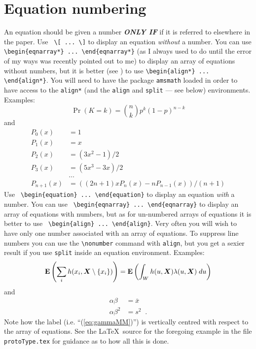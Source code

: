 \documentclass[times, doublespace]{anzsauth}
\newcommand{\E}{\mbox{$\boldsymbol{\rm E}$}}
\newcommand{\bX}{\mbox{$\boldsymbol{X}$}}
\begin{document}
\section{Equation numbering}
\label{sec:eqnNumb}
An equation should be given a number \textbf{\textit{ONLY IF}}
if it is referred to elsewhere in the paper.
Use \verb! \[ ... \]! to display an equation \emph{without} a number.
You can use \verb!\begin{eqnarray*} ... \end{eqnarray*}! (as I always
used to do until the error of my ways was recently pointed out to me) to
display an array of equations without numbers, but it is better (see
\cite{Madsen2006}) to use \verb!\begin{align*} ... \end{align*}!.
You will need to have the package \texttt{amsmath} loaded in order
to have access to the \texttt{align*} (and the \texttt{align}
and \texttt{split} --- see below) environments.  Examples:
\[
\Pr(K = k) = \binom{n}{k} p^k (1-p)^{n-k}
\]
and
\begin{align*}
P_0(x) &= 1 \\
P_1(x) &= x \\
P_2(x) &= (3x^2 - 1)/2 \\
P_3(x) &= (5x^3 - 3x)/2 \\
       & \ldots \\
P_{n+1}(x) &= ((2n+1)xP_n(x) - nP_{n-1}(x))/(n+1)
\end{align*}
Use \verb! \begin{equation} ... \end{equation}! to display an
equation \emph{with} a number.  You can use
\verb! \begin{eqnarray} ... \end{eqnarray}! to display an array of
equations with numbers, but as for un-numbered arrays of equations it
is better to use \verb! \begin{align} ... \end{align}!.  Very often
you will wish to have only one number associated with an array of
equations.  To suppress line numbers you can use the
\verb!\nonumber! command with \texttt{align}, but you get a sexier
result if you use \texttt{split} inside an equation environment.
Examples:
\begin{equation}
\E \left (\sum_i h(x_i,\bX \setminus \{x_i\}) \right )
= \E \left ( \int_W h(u,\bX) \lambda(u,\bX) \; du \right )
\label{eq:GNZ}
\end{equation}
and
\begin{equation}
\begin{split}
\alpha \beta &= \bar{x} \\
\alpha \beta^2 &= s^2 \;\; .
\end{split}
\label{eq:gammaMM}
\end{equation}
Note how the label (i.e. ``(\ref{eq:gammaMM})'') is vertically
centred with respect to the array of equations.  See the \LaTeX\
source for the foregoing example in the file \texttt{protoType.tex}
for guidance as to how all this is done.
\end{document}

